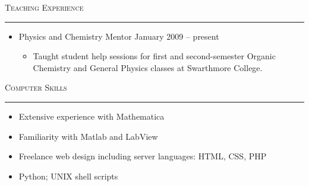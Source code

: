 \documentclass[letterpaper,10pt]{article}
\newcommand{\heading}[1]{\medskip\bigskip \textsc{#1} \medskip \hrule \smallskip}
\begin{document}
\heading{Teaching Experience}
\begin{itemize}
  \item Physics and Chemistry Mentor \hfill January 2009 -- present %
    \begin{itemize}
      \item Taught student help sessions for first and second-semester Organic Chemistry and General Physics classes at Swarthmore College.
    \end{itemize}
\end{itemize}


\heading{Computer Skills}
\begin{itemize}
  \item Extensive experience with Mathematica
  \item Familiarity with Matlab and LabView
  \item Freelance web design including server languages: HTML, CSS, PHP
  \item Python; UNIX shell scripts
\end{itemize}
\end{document}

